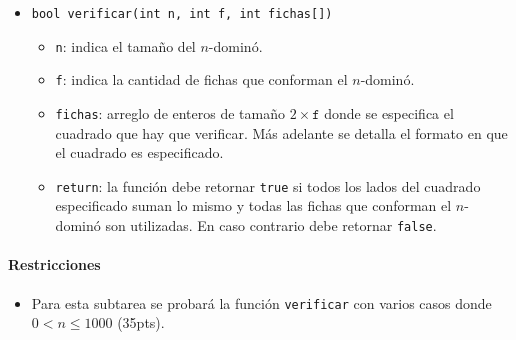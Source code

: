 \documentclass{oci}
\begin{document}
\begin{itemize}
 \item \verb+bool verificar(int n, int f, int fichas[])+
 \begin{itemize}
  \item \verb+n+: indica el tamaño del $n$-dominó.
  \item \verb+f+: indica la cantidad de fichas que conforman el $n$-dominó.
  \item \verb+fichas+: arreglo de enteros de tamaño $2\times\texttt{f}$ donde se especifica el cuadrado que hay que verificar. Más adelante se detalla el formato en que el cuadrado es especificado.
  \item \verb+return+: la función debe retornar \verb+true+ si todos los lados del cuadrado especificado suman lo mismo y todas las fichas que conforman el $n$-dominó son utilizadas. 
   En caso contrario debe retornar \verb+false+.
 \end{itemize}
\end{itemize}

\paragraph{Restricciones}
\begin{itemize}
\item Para esta subtarea se probará la función \verb+verificar+ con varios casos donde $0 < n\leq 1000$ (35pts).
\end{itemize}
\end{document}
